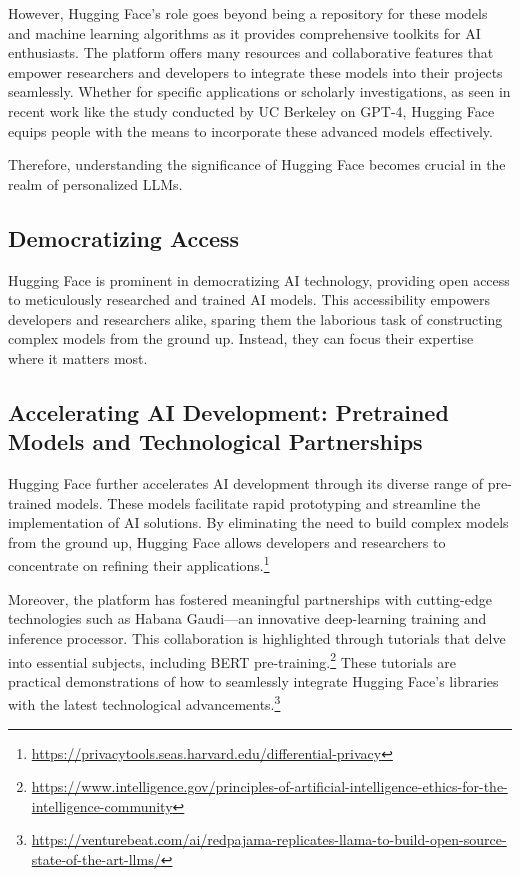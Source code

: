 \documentclass[
]{book}
\begin{document}
However, Hugging Face's role goes beyond being a repository for these models and machine learning algorithms as it provides comprehensive toolkits for AI enthusiasts. The platform offers many resources and collaborative features that empower researchers and developers to integrate these models into their projects seamlessly. Whether for specific applications or scholarly investigations, as seen in recent work like the study conducted by UC Berkeley on GPT-4, Hugging Face equips people with the means to incorporate these advanced models effectively.

Therefore, understanding the significance of Hugging Face becomes crucial in the realm of personalized LLMs.

\hypertarget{democratizing-access}{%
\subsection{Democratizing Access}\label{democratizing-access}}

Hugging Face is prominent in democratizing AI technology, providing open access to meticulously researched and trained AI models. This accessibility empowers developers and researchers alike, sparing them the laborious task of constructing complex models from the ground up. Instead, they can focus their expertise where it matters most.

\hypertarget{accelerating-ai-development-pretrained-models-and-technological-partnerships}{%
\subsection{Accelerating AI Development: Pretrained Models and Technological Partnerships}\label{accelerating-ai-development-pretrained-models-and-technological-partnerships}}

Hugging Face further accelerates AI development through its diverse range of pre-trained models. These models facilitate rapid prototyping and streamline the implementation of AI solutions. By eliminating the need to build complex models from the ground up, Hugging Face allows developers and researchers to concentrate on refining their applications.\footnote{\url{https://privacytools.seas.harvard.edu/differential-privacy}}

Moreover, the platform has fostered meaningful partnerships with cutting-edge technologies such as Habana Gaudi---an innovative deep-learning training and inference processor. This collaboration is highlighted through tutorials that delve into essential subjects, including BERT pre-training.\footnote{\url{https://www.intelligence.gov/principles-of-artificial-intelligence-ethics-for-the-intelligence-community}} These tutorials are practical demonstrations of how to seamlessly integrate Hugging Face's libraries with the latest technological advancements.\footnote{\url{https://venturebeat.com/ai/redpajama-replicates-llama-to-build-open-source-state-of-the-art-llms/}}
\end{document}
